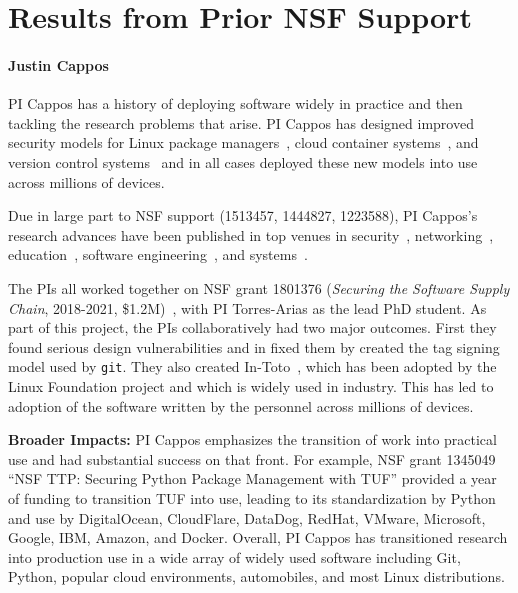 \section{Results from Prior NSF Support}


\paragraph{Justin Cappos}
PI Cappos has a history of deploying software widely in practice and then
tackling the research problems that arise. PI Cappos has designed improved
security models for Linux package managers~\cite{Cappos_CCS_2008}, cloud
container systems~\cite{Kuppusamy_NSDI_2016, Kuppusamy_USENIX_2017}, and
version control systems~\cite{Torres_USENIXSec_2016} and in all cases
deployed these new models into use across millions of devices.

Due in large part to NSF support (1513457, 1444827, 1223588), PI Cappos's
research advances have been published in top venues in
security~\cite{Cappos_CCS_2010, Samuel_CCS_2010, Torres_USENIXSec_2016, Nikitin_USENIXSec_2017, in-toto-paper},
networking~\cite{Zhuang_NSDI_2014, Kuppusamy_NSDI_2016},
education~\cite{Cappos_SIGCSE_2009, Cappos_SIGCSE_2014, Hooshangi_SIGCSE_2015},
software engineering~\cite{Rasley_ISSRE_2015, Oliveira_ACSAC_2014,
Gopstein_FSE_2017},
and systems~\cite{Li_USENIX_2015, Li_USENIX_2017, Kuppusamy_USENIX_2017}.

The PIs all worked together on NSF grant 1801376 (\emph{Securing the Software Supply Chain},
2018-2021, \$1.2M)~\cite{Torres_USENIXSec_2016, le-git-imate, ifip-sec-19, in-toto-paper , le-git-imate-journal}, with PI Torres-Arias as the lead PhD student.
As part of this project, the PIs collaboratively had two major outcomes.  First they found serious design
vulnerabilities and in fixed them by created the tag signing model used by
{\tt git}.  They also created In-Toto~\cite{in-toto-website}, which has been adopted by the Linux
Foundation project and which is widely used in industry.
This has led to adoption of the software
written by the personnel across millions of devices.

\textbf{Broader Impacts:} PI Cappos emphasizes the transition of work into practical use and had
substantial success on that front.  For example, NSF
grant 1345049 ``NSF TTP: Securing Python Package Management with TUF''
provided a year of funding to transition TUF into use, leading to its
standardization by Python and use by
DigitalOcean, CloudFlare, DataDog, RedHat, VMware, Microsoft, Google,
IBM, Amazon, and Docker.
Overall, PI Cappos has
transitioned research into production use in a wide array of widely used
software including Git, Python, popular cloud environments, automobiles,
and most Linux distributions.

